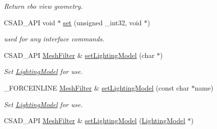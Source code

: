 \begin{DoxyCompactItemize}
\begin{DoxyCompactList}\small\item\em Return vbo view geometry. \end{DoxyCompactList}\item 
\hypertarget{classcsad_1_1_mesh_filter_a6f02c76e82a5228fa57036094cb31421}{C\-S\-A\-D\-\_\-\-A\-P\-I void $\ast$ \hyperlink{classcsad_1_1_mesh_filter_a6f02c76e82a5228fa57036094cb31421}{set} (unsigned \-\_\-int32, void $\ast$)}\label{classcsad_1_1_mesh_filter_a6f02c76e82a5228fa57036094cb31421}

\begin{DoxyCompactList}\small\item\em used for any interface commands. \end{DoxyCompactList}\item 
\hypertarget{classcsad_1_1_mesh_filter_a6fc1f22d3c8519043a0178fc68c3b80f}{C\-S\-A\-D\-\_\-\-A\-P\-I \hyperlink{classcsad_1_1_mesh_filter}{Mesh\-Filter} \& \hyperlink{classcsad_1_1_mesh_filter_a6fc1f22d3c8519043a0178fc68c3b80f}{set\-Lighting\-Model} (char $\ast$)}\label{classcsad_1_1_mesh_filter_a6fc1f22d3c8519043a0178fc68c3b80f}

\begin{DoxyCompactList}\small\item\em Set \hyperlink{classcsad_1_1_lighting_model}{Lighting\-Model} for use. \end{DoxyCompactList}\item 
\hypertarget{classcsad_1_1_mesh_filter_a10d68452775cc7c17e4d06b715ff5aad}{\-\_\-\-F\-O\-R\-C\-E\-I\-N\-L\-I\-N\-E \hyperlink{classcsad_1_1_mesh_filter}{Mesh\-Filter} \& \hyperlink{classcsad_1_1_mesh_filter_a10d68452775cc7c17e4d06b715ff5aad}{set\-Lighting\-Model} (const char $\ast$name)}\label{classcsad_1_1_mesh_filter_a10d68452775cc7c17e4d06b715ff5aad}

\begin{DoxyCompactList}\small\item\em Set \hyperlink{classcsad_1_1_lighting_model}{Lighting\-Model} for use. \end{DoxyCompactList}\item 
\hypertarget{classcsad_1_1_mesh_filter_a4fe8d1767431b43cee19c32535c1d294}{C\-S\-A\-D\-\_\-\-A\-P\-I \hyperlink{classcsad_1_1_mesh_filter}{Mesh\-Filter} \& \hyperlink{classcsad_1_1_mesh_filter_a4fe8d1767431b43cee19c32535c1d294}{set\-Lighting\-Model} (\hyperlink{classcsad_1_1_lighting_model}{Lighting\-Model} $\ast$)}\label{classcsad_1_1_mesh_filter_a4fe8d1767431b43cee19c32535c1d294}


\end{DoxyCompactItemize}
